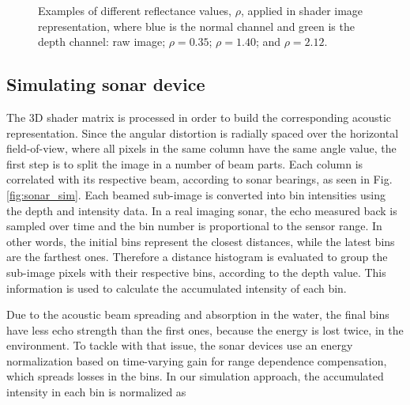\documentclass[final,5p,times]{elsarticle}
\begin{document}
\begin{figure}[h]
{        \label{fig:reflectance:2.12}
    }
    \captionsetup{justification=centering}
    \caption{Examples of different reflectance values, $\rho$, applied in shader image representation, where blue is the normal channel and green is the depth channel:  raw image;  $\rho = 0.35$;  $\rho = 1.40$; and  $\rho = 2.12$.}
    \label{fig:sonar_reflectances}
\end{figure}



\subsection{Simulating sonar device}
\label{dev:sonardata}

The 3D shader matrix is processed in order to build the corresponding acoustic representation. Since the angular distortion is radially spaced over the horizontal field-of-view, where all pixels in the same column have the same angle value, the first step is to split the image in a number of beam parts. Each column is correlated with its respective beam, according to sonar bearings, as seen in Fig. \ref{fig:sonar_sim}. Each beamed sub-image is converted into bin intensities using the depth and intensity data. In a real imaging sonar, the echo measured back is sampled over time and the bin number is proportional to the sensor range. In other words, the initial bins represent the closest distances, while the latest bins are the farthest ones. Therefore a distance histogram is evaluated to group the sub-image pixels with their respective bins, according to the depth value. This information is used to calculate the accumulated intensity of each bin.

Due to the acoustic beam spreading and absorption in the water, the final bins have less echo strength than the first ones, because the energy is lost twice, in the environment. To tackle with that issue, the sonar devices use an energy normalization based on time-varying gain for range dependence compensation, which spreads losses in the bins. In our simulation approach, the accumulated intensity in each bin is normalized as
\end{document}
